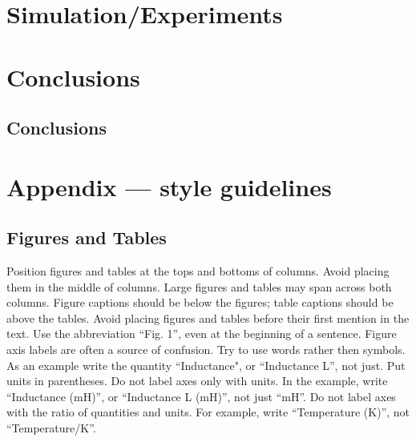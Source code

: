 \documentclass[letterpaper, 10 pt, conference]{ieeeconf}  %
\begin{document}
\section{Simulation/Experiments}

\addtolength{\textheight}{-3cm}   %

\section{Conclusions}

\subsection{Conclusions}

 
  

\section*{Appendix --- style guidelines}

\subsection{Figures and Tables}

Position figures and tables at the tops and bottoms of columns.
Avoid placing them in the middle of columns. Large figures and tables
may span across both columns. Figure captions should be below the figures;
 table captions should be above the tables. Avoid placing figures and tables
  before their first mention in the text. Use the abbreviation ``Fig. 1'',
  even at the beginning of a sentence.
Figure axis labels are often a source of confusion.
Try to use words rather then symbols. As an example write the quantity ``Inductance",
 or ``Inductance L'', not just.
 Put units in parentheses. Do not label axes only with units.
 In the example, write ``Inductance (mH)'', or ``Inductance L (mH)'', not just ``mH''.
 Do not label axes with the ratio of quantities and units.
 For example, write ``Temperature (K)'', not ``Temperature/K''.
\end{document}
